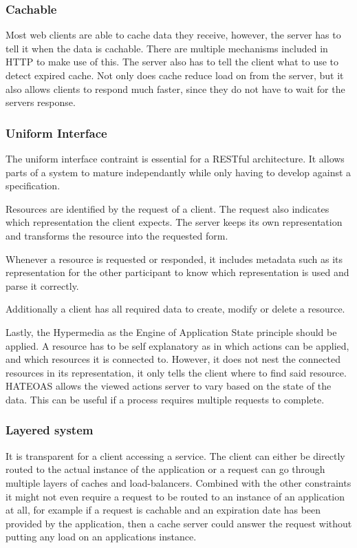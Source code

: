 \subsubsection{Cachable}

Most web clients are able to cache data they receive, however, the server has
to tell it when the data is cachable. There are multiple mechanisms included in
HTTP to make use of this. The server also has to tell the client what to use to
detect expired cache. Not only does cache reduce load on from the server, but
it also allows clients to respond much faster, since they do not have to wait
for the servers response.

\subsubsection{Uniform Interface}

The uniform interface contraint is essential for a RESTful architecture. It
allows parts of a system to mature independantly while only having to develop
against a specification.

Resources are identified by the request of a client. The request also indicates
which representation the client expects. The server keeps its own representation
and transforms the resource into the requested form.

Whenever a resource is requested or responded, it includes metadata such as its
representation for the other participant to know which representation is used
and parse it correctly.

Additionally a client has all required data to create, modify or delete a
resource.

Lastly, the Hypermedia as the Engine of Application State principle should be
applied. A resource has to be self explanatory as in which actions can be
applied, and which resources it is connected to. However, it does not nest the
connected resources in its representation, it only tells the client where to
find said resource. HATEOAS allows the viewed actions server to vary based on
the state of the data. This can be useful if a process requires multiple
requests to complete.

\subsubsection{Layered system}

It is transparent for a client accessing a service. The client can either be
directly routed to the actual instance of the application or a request can go
through multiple layers of caches and load-balancers. Combined with the other
constraints it might not even require a request to be routed to an instance of
an application at all, for example if a request is cachable and an expiration
date has been provided by the application, then a cache server could answer the
request without putting any load on an applications instance.

